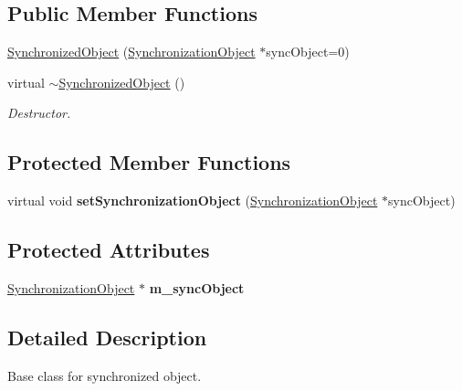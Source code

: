 \subsection*{Public Member Functions}
\begin{DoxyCompactItemize}
\item 
\hyperlink{class_synchronized_object_a9ae8017720af72aac92964f23b55d6f1}{Synchronized\+Object} (\hyperlink{class_synchronized_object_1_1_synchronization_object}{Synchronization\+Object} $\ast$sync\+Object=0)
\item 
virtual \hyperlink{class_synchronized_object_ae2c081d2e252b35a49edbf887579cfe0}{$\sim$\+Synchronized\+Object} ()\hypertarget{class_synchronized_object_ae2c081d2e252b35a49edbf887579cfe0}{}\label{class_synchronized_object_ae2c081d2e252b35a49edbf887579cfe0}

\begin{DoxyCompactList}\small\item\em Destructor. \end{DoxyCompactList}\end{DoxyCompactItemize}
\subsection*{Protected Member Functions}
\begin{DoxyCompactItemize}
\item 
virtual void {\bfseries set\+Synchronization\+Object} (\hyperlink{class_synchronized_object_1_1_synchronization_object}{Synchronization\+Object} $\ast$sync\+Object)\hypertarget{class_synchronized_object_a72f0856ba79569fea9907916e085c555}{}\label{class_synchronized_object_a72f0856ba79569fea9907916e085c555}

\end{DoxyCompactItemize}
\subsection*{Protected Attributes}
\begin{DoxyCompactItemize}
\item 
\hyperlink{class_synchronized_object_1_1_synchronization_object}{Synchronization\+Object} $\ast$ {\bfseries m\+\_\+sync\+Object}\hypertarget{class_synchronized_object_a51605ed5ba10c06e795f21a98ea5ef37}{}\label{class_synchronized_object_a51605ed5ba10c06e795f21a98ea5ef37}

\end{DoxyCompactItemize}


\subsection{Detailed Description}
Base class for synchronized object. 

